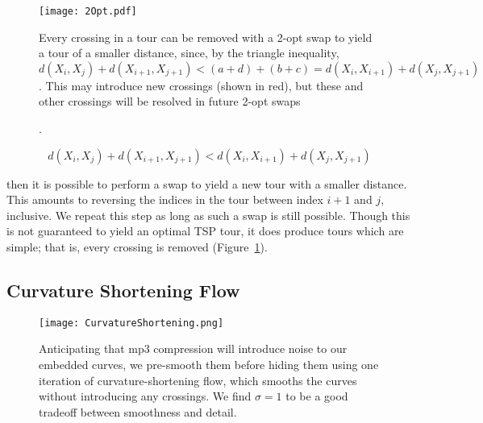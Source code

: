 \documentclass[runningheads]{llncs}
\begin{document}
\begin{figure}
  \begin{minipage}[c]{0.6\textwidth}
    \caption{
      Every crossing in a tour can be removed with a 2-opt swap to yield a tour of a smaller distance, since, by the triangle inequality, $d(X_i, X_j) + d(X_{i+1}, X_{j+1}) < (a+d) + (b+c) = d(X_i, X_{i+1}) + d(X_j, X_{j+1})$.  This may introduce new crossings (shown in red), but these and other crossings will be resolved in future 2-opt swaps
    } \label{fig:TwoOpt}
  \end{minipage}
  \begin{minipage}[c]{0.38\textwidth}
    \texttt{[image: 2Opt.pdf]}
  \end{minipage}\hfill
  
\end{figure}

\begin{figure}
  \centering
  
  \caption{.}
  \label{}
\end{figure}

\begin{equation}
  d(X_i, X_j) + d(X_{i+1}, X_{j+1}) < d(X_i, X_{i+1}) + d(X_j, X_{j+1})
\end{equation}

then it is possible to perform a swap to yield a new tour with a smaller distance.  This amounts to reversing the indices in the tour between index $i+1$ and $j$, inclusive.  We repeat this step as long as such a swap is still possible.  Though this is not guaranteed to yield an optimal TSP tour, it does produce tours which are simple; that is, every crossing is removed (Figure~\ref{fig:TwoOpt}).


\subsection{Curvature Shortening Flow}

\begin{figure}
  \centering
  \texttt{[image: CurvatureShortening.png]}
  \caption{Anticipating that mp3 compression will introduce noise to our embedded curves, we pre-smooth them before hiding them using one iteration of curvature-shortening flow, which smooths the curves without introducing any crossings.  We find $\sigma=1$ to be a good tradeoff between smoothness and detail.}
  \label{fig:CurvatureShortening}
\end{figure}
\end{document}
